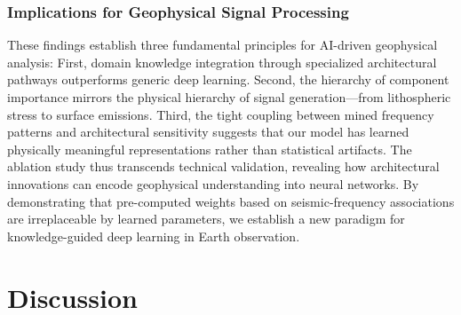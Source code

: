 \documentclass[fleqn,10pt]{wlscirep_mdpi_style}
\begin{document}
\subsubsection{Implications for Geophysical Signal Processing} 
These findings establish three fundamental principles for AI-driven geophysical analysis: First, domain knowledge integration through specialized architectural pathways outperforms generic deep learning. Second, the hierarchy of component importance mirrors the physical hierarchy of signal generation—from lithospheric stress to surface emissions. Third, the tight coupling between mined frequency patterns and architectural sensitivity suggests that our model has learned physically meaningful representations rather than statistical artifacts.
The ablation study thus transcends technical validation, revealing how architectural innovations can encode geophysical understanding into neural networks. By demonstrating that pre-computed weights based on seismic-frequency associations are irreplaceable by learned parameters, we establish a new paradigm for knowledge-guided deep learning in Earth observation.

 \FloatBarrier 
\section{Discussion}
\end{document}
